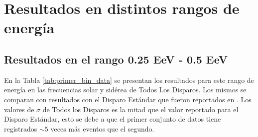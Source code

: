 \section{Resultados en distintos rangos de energía}
\subsection{Resultados en el rango 0.25 EeV - 0.5 EeV}

En la Tabla \ref{tab:primer_bin_data} se presentan los resultados para este rango de energía en las frecuencias solar y sidérea de Todos Los Disparos. Los mismos  se comparan con resultados con el Disparo Estándar que fueron reportados en \cite{Aab_2020}. Los valores de $\sigma$ de Todos los Disparos es la mitad que el valor reportado para el Disparo Estándar,  esto se debe a que el primer conjunto de datos tiene registrados $\sim 5$  veces más eventos que el segundo.

